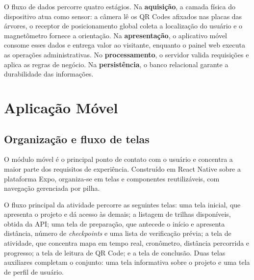 O fluxo de dados percorre quatro estágios. Na \textbf{aquisição}, a camada física
do dispositivo atua como sensor: a câmera lê os QR Codes afixados nas placas das
árvores, o receptor de posicionamento global coleta a localização do usuário e o
magnetômetro fornece a orientação. Na \textbf{apresentação}, o aplicativo móvel
consome esses dados e entrega valor ao visitante, enquanto o painel web executa as
operações administrativas. No \textbf{processamento}, o servidor valida
requisições e aplica as regras de negócio. Na \textbf{persistência}, o banco
relacional garante a durabilidade das informações.

%

\section{Aplicação Móvel}
\label{sec:app_movel}

\subsection{Organização e fluxo de telas}

O módulo móvel é o principal ponto de contato com o usuário e concentra a maior
parte dos requisitos de experiência. Construído em React Native sobre a
plataforma Expo, organiza-se em telas e componentes reutilizáveis, com navegação
gerenciada por pilha.

O fluxo principal da atividade percorre as seguintes telas: uma tela inicial, que
apresenta o projeto e dá acesso às demais; a listagem de trilhas disponíveis,
obtida da API; uma tela de preparação, que antecede o início e apresenta
distância, número de \textit{checkpoints} e uma lista de verificação prévia; a
tela de atividade, que concentra mapa em tempo real, cronômetro, distância
percorrida e progresso; a tela de leitura de QR Code; e a tela de conclusão. Duas
telas auxiliares completam o conjunto: uma tela informativa sobre o projeto e uma
tela de perfil de usuário.

